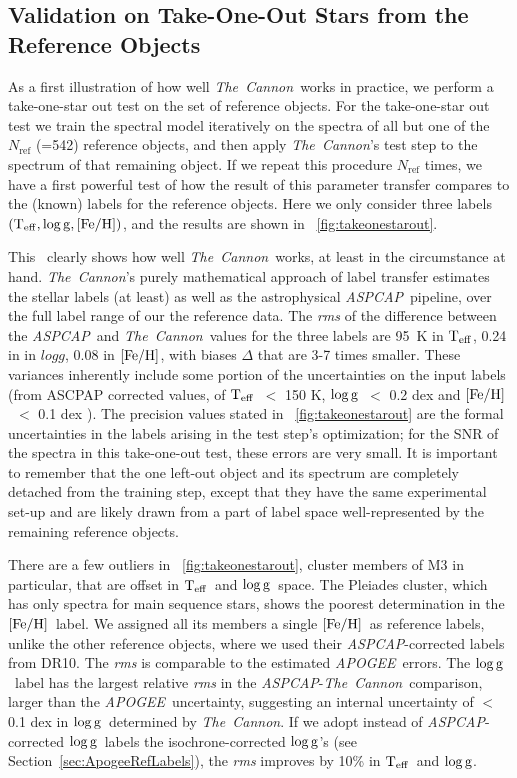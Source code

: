\documentclass[12pt, preprint]{aastex}
\newcommand{\sectionname}{Section}
\newcommand{\tc}{\textsl{The~Cannon}}
\newcommand{\apogee}{\textsl{APOGEE}}
\newcommand{\aspcap}{\textsl{ASPCAP}}
\newcommand{\teff}{\mbox{$\rm T_{eff}$}}
\newcommand{\feh}{\mbox{$\rm [Fe/H]$}}
\newcommand{\logg}{\mbox{$\rm \log g$}}
\newcommand{\rfn}{\mathrm{ref}}
\begin{document}
\subsection{Validation on Take-One-Out Stars from the Reference Objects}
\label{sec:take-one-out}

As a first illustration of how well \tc\ works in practice, we perform a take-one-star out test on the set of reference objects.
For the take-one-star out test we train the spectral model iteratively on the spectra of all but one of the $N_\rfn$ (=542) 
reference objects, and then apply \tc 's test step to the spectrum of that remaining object. If we repeat this procedure $N_\rfn$ times, 
we have a first powerful test of how the result of this parameter transfer compares to the (known) labels for the reference objects.
 Here we only consider three labels $(\teff , \logg , \feh)$, and the results are shown in \figurename~\ref{fig:takeonestarout}.

This \figurename\ clearly shows how well \tc\ works, at least in the circumstance at hand.
\tc 's purely mathematical approach of label transfer estimates the stellar labels (at least) as well as the astrophysical \aspcap\ pipeline,
over the full label range of our the reference data. The \textit{rms} of the difference between the \aspcap\ and \tc\ values for the three labels are
95~K in $\teff$, 0.24 in in $logg$, 0.08 in $\feh$, with biases $\Delta$ that are 3-7 times smaller.  
These variances inherently include some portion of the uncertainties on the input labels (from ASCPAP corrected values, 
of \teff\ $<$ 150 K, \logg\ $<$ 0.2 dex and \feh\ $<$ 0.1 dex \citep{Meszaros2013}).
The precision values stated in \figurename~\ref{fig:takeonestarout} are the formal uncertainties in the labels arising 
in the test step's optimization; for the SNR of the spectra in this take-one-out test, these errors are very small.
It is important to remember that the one left-out object and its spectrum are completely detached from the training step, 
except that they have the same experimental set-up and are likely drawn from a part of label space well-represented by the remaining reference objects.

There are a few outliers in \figurename~\ref{fig:takeonestarout}, cluster members of M3 in particular, that are offset in \teff\ and \logg\ space. 
The Pleiades cluster, which has only spectra for main sequence stars, shows the poorest determination in the \feh\ label. We assigned all its members a single \feh ~as reference labels, unlike the other reference objects, where we used their \aspcap -corrected labels from DR10.
The \textit{rms} is comparable to the estimated \apogee\ errors. The \logg\ label has the largest relative \textit{rms} in the \aspcap\--\tc\ comparison, larger than the \apogee\ uncertainty, suggesting an internal uncertainty of $<$ 0.1 dex in \logg\ determined by \tc.
If we adopt instead of \aspcap -corrected \logg\ labels the isochrone-corrected \logg 's (see \sectionname~\ref{sec:ApogeeRefLabels}), the \textit{rms} improves by 10\% in \teff\ and \logg.
\end{document}

